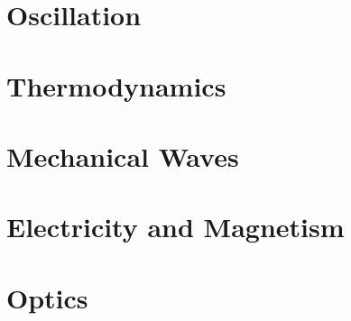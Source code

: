 \documentclass[english,twoside]{labmanual} %
\begin{document}

%
%
%
%
%
%
%

\part{Oscillation}




%
%
%

\part{Thermodynamics}


%


%
%

\part{Mechanical Waves}




\part{Electricity and Magnetism}


%










\part{Optics}







\end{document}
